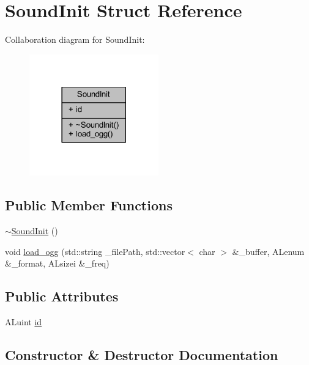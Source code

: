 \hypertarget{struct_sound_init}{}\section{Sound\+Init Struct Reference}
\label{struct_sound_init}


Collaboration diagram for Sound\+Init\+:
\nopagebreak
\begin{figure}[H]
\begin{center}
\leavevmode
\includegraphics[width=158pt]{struct_sound_init__coll__graph}
\end{center}
\end{figure}
\subsection*{Public Member Functions}
\begin{DoxyCompactItemize}
\item 
\mbox{\hyperlink{struct_sound_init_a883a2ba69eda5faa5b405a383bab95ea}{$\sim$\+Sound\+Init}} ()
\item 
void \mbox{\hyperlink{struct_sound_init_adc9642cf26b528304eb9cd85bd178889}{load\+\_\+ogg}} (std\+::string \+\_\+file\+Path, std\+::vector$<$ char $>$ \&\+\_\+buffer, A\+Lenum \&\+\_\+format, A\+Lsizei \&\+\_\+freq)
\end{DoxyCompactItemize}
\subsection*{Public Attributes}
\begin{DoxyCompactItemize}
\item 
A\+Luint \mbox{\hyperlink{struct_sound_init_a1b59128bbf63c76a8bd40019b3090447}{id}}
\end{DoxyCompactItemize}


\subsection{Constructor \& Destructor Documentation}
\mbox{\label{struct_sound_init_a883a2ba69eda5faa5b405a383bab95ea}} 
